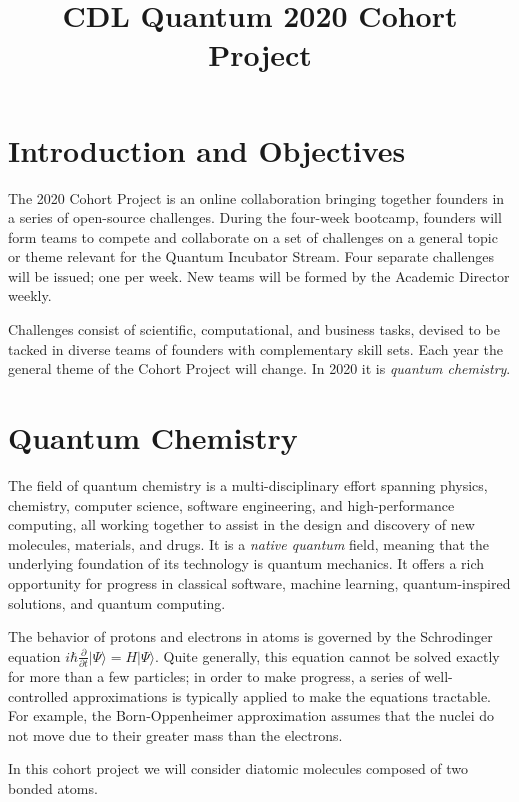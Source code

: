 \documentclass[12pt]{article}
\title{CDL Quantum 2020 Cohort Project}
\begin{document}
\maketitle

\thispagestyle{empty}
\section*{Introduction and Objectives}

The 2020 Cohort Project is an online collaboration bringing together founders in a series of open-source challenges.
During the four-week bootcamp, founders will form teams to compete and collaborate on a set of challenges on a general topic or theme
relevant for the Quantum Incubator Stream.  Four separate challenges will be issued; one per week.  New teams will be formed by the Academic Director weekly.

Challenges consist of scientific, computational, and business tasks, devised to be tacked in diverse teams of founders with complementary skill sets.  Each year
the general theme of the Cohort Project will change.  In 2020 it is {\it quantum chemistry}.


\section*{Quantum Chemistry}

The field of quantum chemistry is a multi-disciplinary effort spanning physics, chemistry, computer science, software engineering, and high-performance computing,
all working together to assist in the design and discovery of new molecules, materials, and drugs.  It is a {\it native quantum} field, meaning that the underlying
foundation of its technology is quantum mechanics. It offers a rich opportunity for progress in classical software, machine learning, quantum-inspired solutions,
and quantum computing.

The behavior of protons and electrons in atoms is governed by the Schrodinger equation $i \hbar \frac{\partial }{ \partial t}  | \Psi \rangle = H | \Psi \rangle$.
Quite generally, this equation cannot be solved exactly for more than a few particles; in order to make progress, a series of well-controlled approximations is 
typically applied to make the equations tractable.  For example, the Born-Oppenheimer approximation assumes that the nuclei do not move due to their 
greater mass than the electrons.  

In this cohort project we will consider diatomic molecules composed of two bonded atoms.
 
\end{document}
